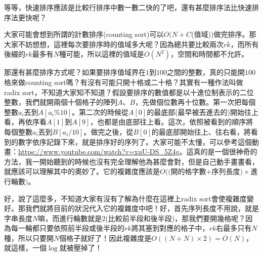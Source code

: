 \documentclass[main.tex]{subfiles}
\begin{document}
		等等，快速排序應該是比較行排序中數一數二快的了吧，還有甚麼排序法比快速排序法更快呢？
		
		大家可能會想到所謂的計數排序(counting sort)可以$O(N+C$(值域))做完排序。那大家不妨想想，這裡每次要排序時的值域多大呢？因為總共要比較兩次$rk$，而所有後綴的$rk$最多有$N$種可能，所以這裡的值域是$O(N^2)$，空間和時間都不允許。
		
		那還有甚麼排序方式呢？如果要排序值域界在$1$到$100$之間的整數，真的只能開$100$格來做counting sort嗎？有沒有可能只開十格或二十格？其實有一種作法叫做radix sort，不知道大家知不知道？假設要排序的數值都是以十進位制表示的二位整數，我們就開兩個十個格子的陣列$A$、$B$，先做個位數再十位數。第一次把每個整數$a_i$丟到$A[a_i\%10]$。第二次的時候從$A[0]$的最底部(最早被丟進去的)開始往上看，再依序看$A[1]$到$A[9]$，也都是由底部往上看。這次，依照被看到的順序將每個整數$a_i$丟到$B[a_i/10]$。做完之後，從$B[0]$的最底部開始往上、往右看，將看到的數字依序記錄下來，就是排序好的序列了。大家可能不太懂，可以參考這個動畫：\url{https://www.youtube.com/watch?v=xuU-DS_5Z4g}。這真的是一個很神奇的方法，我一開始聽到的時候也沒有完全理解他為甚麼會對，但是自己動手畫畫看，就應該可以理解其中的奧妙了。它的複雜度應該是$O(($開的格字數$+$序列長度$) \times$進行輪數$)$。
		
		好，說了這麼多，不知道大家有沒有了解為什麼在這裡上radix sort會使複雜度變好。那我們就將目前的狀況代入它的複雜度中吧！好，首先序列長度不用說，就是字串長度$N$嘛，而進行輪數就是$2$(比較前半段和後半段)，那我們要開幾格呢？因為每一輪都只要依照前半段或後半段的$rk$將其塞到對應的格子中，$rk$右最多只有$N$種，所以只要開$N$個格子就好了！因此複雜度是$O((N+N) \times 2) = O(N)$，就這樣，一個$\log$就被壓掉了！
		
\end{document}
